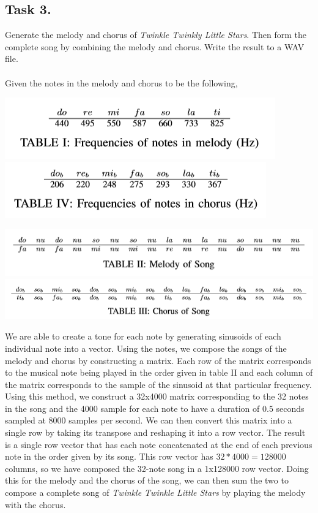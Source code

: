 \documentclass{article}
\begin{document}
    \subsection{Task 3.} Generate the melody and chorus of \textit{Twinkle Twinkly Little Stars}. Then form the complete song by combining the melody and chorus. Write the result to a WAV file.\\
        \vspace{5mm}\\
        Given the notes in the melody and chorus to be the following,
        \begin{center}
            \includegraphics[scale=0.8]{table1.PNG}
            \includegraphics[scale=0.8]{table4.PNG}
        \end{center}
        \begin{center}
            \includegraphics[width=\textwidth]{table2.PNG}
            \includegraphics[width=\textwidth]{table3.PNG}
        \end{center}
        We are able to create a tone for each note by generating sinusoids of each individual note into a vector. Using the notes, we compose the songs of the melody and chorus by constructing a matrix. Each row of the matrix corresponds to the musical note being played in the order given in table II and each column of the matrix corresponds to the sample of the sinusoid at that particular frequency. Using this method, we construct a 32x4000 matrix corresponding to the 32 notes in the song and the 4000 sample for each note to have a duration of 0.5 seconds sampled at 8000 samples per second. We can then convert this matrix into a single row by taking its transpose and reshaping it into a row vector. The result is a single row vector that has each note concatenated at the end of each previous note in the order given by its song. This row vector has $32*4000=128000$ columns, so we have composed the 32-note song in a 1x128000 row vector. Doing this for the melody and the chorus of the song, we can then sum the two to compose a complete song of \textit{Twinkle Twinkle Little Stars} by playing the melody with the chorus.
\end{document}
